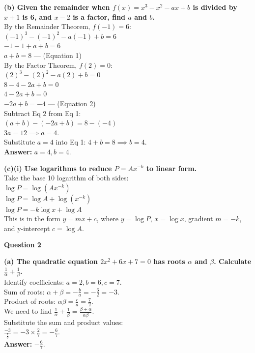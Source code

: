 \documentclass[12pt]{article}
\begin{document}
\textbf{(b) Given the remainder when $f(x) = x^3 - x^2 - ax + b$ is divided by $x+1$ is 6, and $x-2$ is a factor, find $a$ and $b$.} \\
By the Remainder Theorem, $f(-1) = 6$: \\
$(-1)^3 - (-1)^2 - a(-1) + b = 6$ \\
$-1 - 1 + a + b = 6$ \\
$a + b = 8$ \quad --- (Equation 1) \\
By the Factor Theorem, $f(2) = 0$: \\
$(2)^3 - (2)^2 - a(2) + b = 0$ \\
$8 - 4 - 2a + b = 0$ \\
$4 - 2a + b = 0$ \\
$-2a + b = -4$ \quad --- (Equation 2) \\
Subtract Eq 2 from Eq 1: \\
$(a + b) - (-2a + b) = 8 - (-4)$ \\
$3a = 12 \implies a = 4$. \\
Substitute $a = 4$ into Eq 1: $4 + b = 8 \implies b = 4$. \\
\textbf{Answer:} $a = 4, b = 4$.

\textbf{(c)(i) Use logarithms to reduce $P = Ax^{-k}$ to linear form.} \\
Take the base 10 logarithm of both sides: \\
$\log P = \log(Ax^{-k})$ \\
$\log P = \log A + \log(x^{-k})$ \\
$\log P = -k \log x + \log A$ \\
This is in the form $y = mx + c$, where $y = \log P$, $x = \log x$, gradient $m = -k$, and y-intercept $c = \log A$.

\vspace{1em}
\textbf{Question 2}

\textbf{(a) The quadratic equation $2x^2 + 6x + 7 = 0$ has roots $\alpha$ and $\beta$. Calculate $\frac{1}{\alpha} + \frac{1}{\beta}$.} \\
Identify coefficients: $a = 2, b = 6, c = 7$. \\
Sum of roots: $\alpha + \beta = -\frac{b}{a} = -\frac{6}{2} = -3$. \\
Product of roots: $\alpha\beta = \frac{c}{a} = \frac{7}{2}$. \\
We need to find $\frac{1}{\alpha} + \frac{1}{\beta} = \frac{\beta + \alpha}{\alpha\beta}$. \\
Substitute the sum and product values: \\
$\frac{-3}{\frac{7}{2}} = -3 \times \frac{2}{7} = -\frac{6}{7}$. \\
\textbf{Answer:} $-\frac{6}{7}$.
\end{document}
